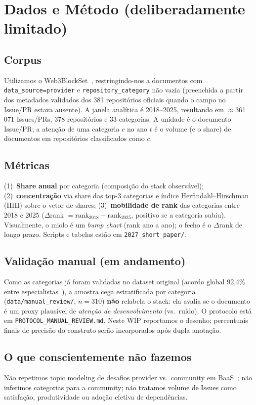 \documentclass[10pt,conference]{IEEEtran}
\begin{document}
\section{Dados e Método (deliberadamente limitado)}

\subsection{Corpus}
Utilizamos o Web3BlockSet~\cite{soares2026web3blockset}, restringindo-nos a documentos com \texttt{data\_source=provider} e \texttt{repository\_category} não vazia (preenchida a partir dos metadados validados dos 381 repositórios oficiais quando o campo no Issue/PR estava ausente). A janela analítica é 2018--2025, resultando em $\approx$361\,071 Issues/PRs, 378 repositórios e 33 categorias. A unidade é o documento Issue/PR; a atenção de uma categoria $c$ no ano $t$ é o volume (e o share) de documentos em repositórios classificados como $c$.

\subsection{Métricas}
(1)~\textbf{Share anual} por categoria (composição do stack observável); (2)~\textbf{concentração} via share das top-3 categorias e índice Herfindahl--Hirschman (HHI) sobre o vetor de shares; (3)~\textbf{mobilidade de rank} das categorias entre 2018 e 2025 ($\Delta$rank $= \mathrm{rank}_{2018}-\mathrm{rank}_{2025}$, positivo se a categoria subiu). Visualmente, o miolo é um \emph{bump chart} (rank ano a ano); o fecho é o $\Delta$rank de longo prazo. Scripts e tabelas estão em \texttt{2027\_short\_paper/}.

\subsection{Validação manual (em andamento)}
Como as categorias já foram validadas no dataset original (acordo global 92,4\% entre especialistas~\cite{soares2026web3blockset}), a amostra cega estratificada por categoria (\texttt{data/manual\_review/}, $n{=}310$) \textbf{não} relabela o stack: ela avalia se o documento é um proxy plausível de \emph{atenção de desenvolvimento} (vs.\ ruído). O protocolo está em \texttt{PROTOCOL\_MANUAL\_REVIEW.md}. Neste WIP reportamos o desenho; percentuais finais de precisão do construto serão incorporados após dupla anotação.

\subsection{O que conscientemente não fazemos}
Não repetimos topic modeling de desafios provider vs.\ community em BaaS~\cite{soares2025bcdex}; não inferimos categorias para a community; não tratamos volume de Issues como satisfação, produtividade ou adoção efetiva de dependências.
\end{document}
